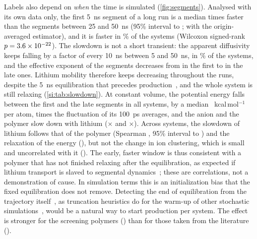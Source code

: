 \documentclass[preprint,12pt]{elsarticle}
\begin{document}
Labels also depend on \emph{when} the time is simulated (\cref{fig:segments}). Analysed with its own
data only, the first \SI{5}{\nano\second} segment of a long run is a median \segEndFirst{} times
faster than the segments between 25 and \SI{50}{\nano\second} (95\% interval \segEndFirstLo{} to
\segEndFirstHi; \segHalfFirst{} with the origin-averaged estimator), and it is faster in
\segEndFracFirstPct\% of the systems (Wilcoxon signed-rank $p=3.6\times10^{-22}$). The slowdown is
not a short transient: the apparent diffusivity keeps falling by a factor of \segEndSlope{} every
\SI{10}{\nano\second} between 5 and \SI{50}{\nano\second}, in \segEndFracNegSlopePct\% of the
systems, and the effective exponent of the segments decreases from \segBetaFirst{} in the first
to \segBetaLate{} in the late ones. Lithium mobility therefore keeps decreasing throughout the
runs, despite the \SI{5}{\nano\second} equilibration that precedes
production~\cite{Xie2022Accelerating}, and the whole system is still relaxing
(\cref{si:tab:slowdown}). At constant volume, the potential energy falls between the first and the
late segments in all \slowN{} systems, by a median \slowPe{}~kcal\,mol$^{-1}$ per atom,
\slowPeOverNoise{} times the fluctuation of its \SI{100}{\pico\second} averages, and the anion
and the polymer slow down with lithium ($\times$\slowTfsi{} and $\times$\slowMat). Across
systems, the slowdown of lithium follows that of the polymer (Spearman \slowCorrMat, 95\%
interval \slowCorrMatLo{} to \slowCorrMatHi) and the relaxation of the energy (\slowCorrPe), but
not the change in ion clustering, which is small and uncorrelated with it (\slowCorrCluster).
The early, faster window is thus consistent with a polymer that has not finished relaxing after the
equilibration, as expected if lithium transport is slaved to segmental
dynamics~\cite{Borodin2006PEO,Webb2015Polyester}; these are correlations, not a demonstration of
cause. In simulation terms this is an initialization bias that the fixed equilibration does not
remove. Detecting the end of equilibration from the trajectory itself~\cite{Chodera2016Equilibration},
as truncation heuristics do for the warm-up of other stochastic
simulations~\cite{White1997MSER,Hoad2010WarmUp}, would be a natural way to start production per
system.
The effect is stronger for the screening polymers (\segEndFirstScreen) than for those taken from
the literature (\segEndFirstLit).
\end{document}
